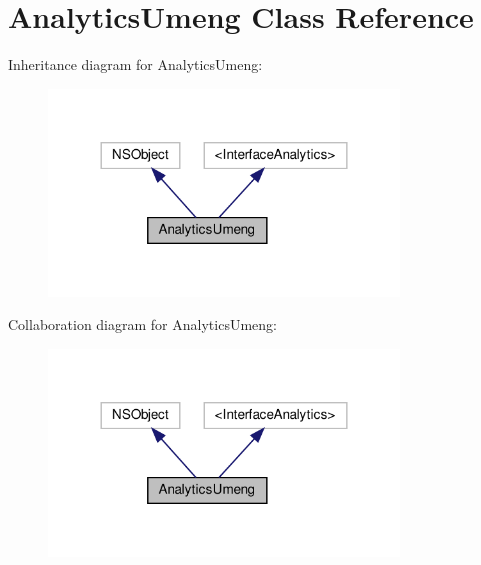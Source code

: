 \hypertarget{interfaceAnalyticsUmeng}{}\section{Analytics\+Umeng Class Reference}
\label{interfaceAnalyticsUmeng}


Inheritance diagram for Analytics\+Umeng\+:
\nopagebreak
\begin{figure}[H]
\begin{center}
\leavevmode
\includegraphics[width=264pt]{interfaceAnalyticsUmeng__inherit__graph}
\end{center}
\end{figure}


Collaboration diagram for Analytics\+Umeng\+:
\nopagebreak
\begin{figure}[H]
\begin{center}
\leavevmode
\includegraphics[width=264pt]{interfaceAnalyticsUmeng__coll__graph}
\end{center}
\end{figure}
